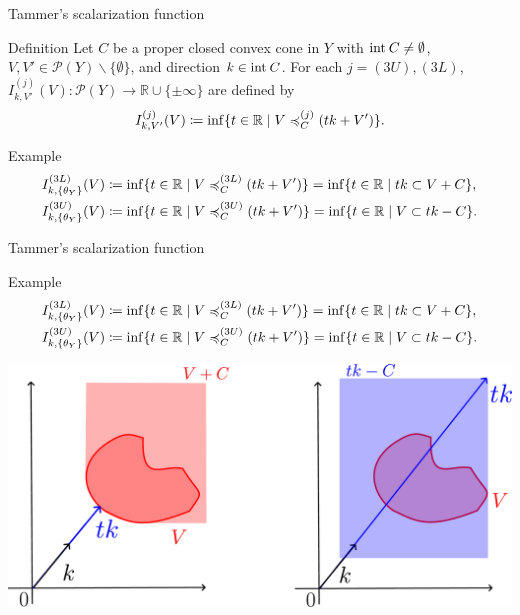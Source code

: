 \documentclass[aspectratio=169, dvipdfmx, 11pt]{beamer}
\newcommand{\RealNumberSet}{\mathbb{R}}
\newcommand{\Interior}[1]{\text{\rm int\:${#1}$}} %
\begin{document}
\begin{frame}{Tammer's scalarization function}
  \begin{block}{Definition \cite{MR2778674}}
    Let $C$ be a proper closed convex cone in $Y$ with $\Interior{C} \ne \emptyset$,
    $V, V' \in \mathcal{P}(Y) \backslash \{\emptyset\}$, and direction $k \in \Interior{C}$.
    For each $j = (3U), (3L)$, $I^{(j)}_{k, V'} (V) \colon \mathcal{P}(Y) \to \RealNumberSet \cup \{\pm \infty\}$
    are defined by
    \begin{equation}
      I^{(j)}_{k, V'} (V) \coloneq \inf\{ t \in \RealNumberSet \mid V \preccurlyeq_{C}^{(j)} (tk + V') \}. \notag
    \end{equation}
  \end{block}
  \begin{exampleblock}{Example}
    \begin{align}
      I^{(3L)}_{k, \{\theta_{Y}\}} (V) & \coloneq \inf\{ t \in \RealNumberSet \mid V \preccurlyeq_{C}^{(3L)} (tk + V') \}
      = \inf\{ t \in \RealNumberSet \mid tk \subset V + C \}, \notag                                                      \\
      I^{(3U)}_{k, \{\theta_{Y}\}} (V) & \coloneq \inf\{ t \in \RealNumberSet \mid V \preccurlyeq_{C}^{(3U)} (tk + V') \}
      = \inf\{ t \in \RealNumberSet \mid V \subset tk - C \}. \notag
    \end{align}
  \end{exampleblock}
\end{frame}

\begin{frame}{Tammer's scalarization function}
  \begin{exampleblock}{Example}
    \begin{align}
      I^{(3L)}_{k, \{\theta_{Y}\}} (V) & \coloneq \inf\{ t \in \RealNumberSet \mid V \preccurlyeq_{C}^{(3L)} (tk + V') \}
      = \inf\{ t \in \RealNumberSet \mid tk \subset V + C \}, \notag                                                      \\
      I^{(3U)}_{k, \{\theta_{Y}\}} (V) & \coloneq \inf\{ t \in \RealNumberSet \mid V \preccurlyeq_{C}^{(3U)} (tk + V') \}
      = \inf\{ t \in \RealNumberSet \mid V \subset tk - C \}. \notag
    \end{align}
  \end{exampleblock}
  \centering
  \includegraphics[keepaspectratio, scale=0.10]{figures/eps/tammar_scalarization_example.eps}
\end{frame}
\end{document}
